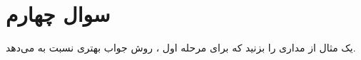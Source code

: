 \section{سوال چهارم}


یک مثال از مداری را بزنید که برای مرحله اول ، روش  جواب بهتری نسبت به  می‌دهد.